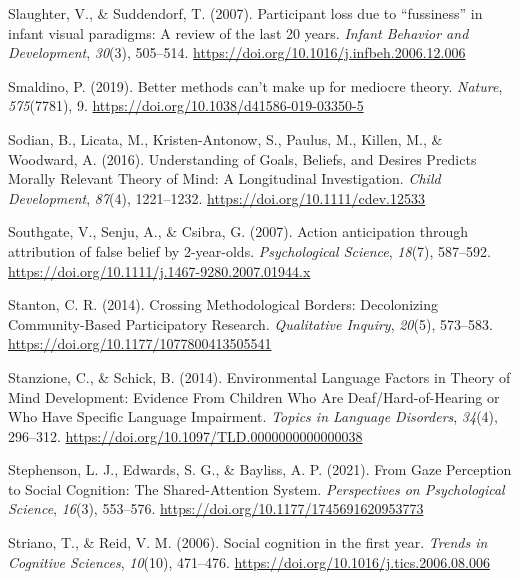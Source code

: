 \documentclass[
]{scrbook}
\newlength{\cslhangindent}
\newenvironment{CSLReferences}[2] %
 {\begin{list}{}{%
  \setlength{\itemindent}{0pt}
  \setlength{\leftmargin}{0pt}
  \setlength{\parsep}{0pt}
  \ifodd #1
   \setlength{\leftmargin}{\cslhangindent}
   \setlength{\itemindent}{-1\cslhangindent}
  \fi
  \setlength{\itemsep}{#2\baselineskip}}}
 {\end{list}}
\begin{document}
\begin{CSLReferences}{1}{0}
Slaughter, V., \& Suddendorf, T. (2007). Participant loss due to {``fussiness''} in infant visual paradigms: {A} review of the last 20 years. \emph{Infant Behavior and Development}, \emph{30}(3), 505--514. \url{https://doi.org/10.1016/j.infbeh.2006.12.006}

Smaldino, P. (2019). Better methods can't make up for mediocre theory. \emph{Nature}, \emph{575}(7781), 9. \url{https://doi.org/10.1038/d41586-019-03350-5}

Sodian, B., Licata, M., Kristen-Antonow, S., Paulus, M., Killen, M., \& Woodward, A. (2016). Understanding of {Goals}, {Beliefs}, and {Desires Predicts Morally Relevant Theory} of {Mind}: {A Longitudinal Investigation}. \emph{Child Development}, \emph{87}(4), 1221--1232. \url{https://doi.org/10.1111/cdev.12533}

Southgate, V., Senju, A., \& Csibra, G. (2007). Action anticipation through attribution of false belief by 2-year-olds. \emph{Psychological Science}, \emph{18}(7), 587--592. \url{https://doi.org/10.1111/j.1467-9280.2007.01944.x}

Stanton, C. R. (2014). Crossing {Methodological Borders}: {Decolonizing Community-Based Participatory Research}. \emph{Qualitative Inquiry}, \emph{20}(5), 573--583. \url{https://doi.org/10.1177/1077800413505541}

Stanzione, C., \& Schick, B. (2014). Environmental {Language Factors} in {Theory} of {Mind Development}: {Evidence From Children Who Are Deaf}/{Hard-of-Hearing} or {Who Have Specific Language Impairment}. \emph{Topics in Language Disorders}, \emph{34}(4), 296--312. \url{https://doi.org/10.1097/TLD.0000000000000038}

Stephenson, L. J., Edwards, S. G., \& Bayliss, A. P. (2021). From {Gaze Perception} to {Social Cognition}: {The Shared-Attention System}. \emph{Perspectives on Psychological Science}, \emph{16}(3), 553--576. \url{https://doi.org/10.1177/1745691620953773}

Striano, T., \& Reid, V. M. (2006). Social cognition in the first year. \emph{Trends in Cognitive Sciences}, \emph{10}(10), 471--476. \url{https://doi.org/10.1016/j.tics.2006.08.006}


\end{CSLReferences}
\end{document}
